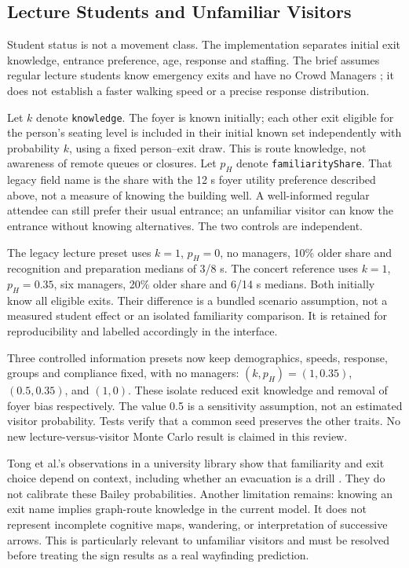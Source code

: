 \subsection{Lecture Students and Unfamiliar Visitors}\label{sec:audience-encoding}

Student status is not a movement class. The implementation separates initial exit knowledge, entrance preference, age, response and staffing. The brief assumes regular lecture students know emergency exits and have no Crowd Managers \cite{brief}; it does not establish a faster walking speed or a precise response distribution.

Let $k$ denote \texttt{knowledge}. The foyer is known initially; each other exit eligible for the person's seating level is included in their initial known set independently with probability $k$, using a fixed person--exit draw. This is route knowledge, not awareness of remote queues or closures. Let $p_H$ denote \texttt{familiarityShare}. That legacy field name is the share with the 12 s foyer utility preference described above, not a measure of knowing the building well. A well-informed regular attendee can still prefer their usual entrance; an unfamiliar visitor can know the entrance without knowing alternatives. The two controls are independent.

The legacy lecture preset uses $k=1$, $p_H=0$, no managers, 10\% older share and recognition and preparation medians of 3/8 s. The concert reference uses $k=1$, $p_H=0.35$, six managers, 20\% older share and 6/14 s medians. Both initially know all eligible exits. Their difference is a bundled scenario assumption, not a measured student effect or an isolated familiarity comparison. It is retained for reproducibility and labelled accordingly in the interface.

Three controlled information presets now keep demographics, speeds, response, groups and compliance fixed, with no managers: $(k,p_H)=(1,0.35)$, $(0.5,0.35)$, and $(1,0)$. These isolate reduced exit knowledge and removal of foyer bias respectively. The value 0.5 is a sensitivity assumption, not an estimated visitor probability. Tests verify that a common seed preserves the other traits. No new lecture-versus-visitor Monte Carlo result is claimed in this review.

Tong et al.'s observations in a university library show that familiarity and exit choice depend on context, including whether an evacuation is a drill \cite{tong2025}. They do not calibrate these Bailey probabilities. Another limitation remains: knowing an exit name implies graph-route knowledge in the current model. It does not represent incomplete cognitive maps, wandering, or interpretation of successive arrows. This is particularly relevant to unfamiliar visitors and must be resolved before treating the sign results as a real wayfinding prediction.
